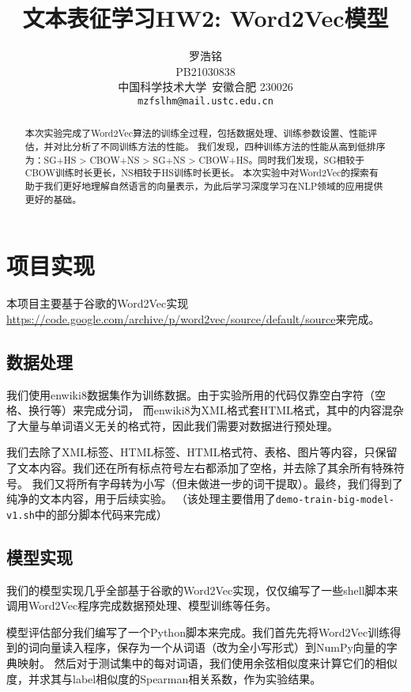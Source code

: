 \documentclass{article}
\title{文本表征学习HW2: Word2Vec模型}
\author{
  罗浩铭 \\
  PB21030838\\
  中国科学技术大学\ 安徽合肥 230026 \\
  \texttt{mzfslhm@mail.ustc.edu.cn} \\
}
\begin{document}
\maketitle


\begin{abstract}
  本次实验完成了Word2Vec算法的训练全过程，包括数据处理、训练参数设置、性能评估，并对比分析了不同训练方法的性能。
  我们发现，四种训练方法的性能从高到低排序为：SG+HS > CBOW+NS > SG+NS > CBOW+HS。同时我们发现，SG相较于CBOW训练时长更长，NS相较于HS训练时长更长。
  本次实验中对Word2Vec的探索有助于我们更好地理解自然语言的向量表示，为此后学习深度学习在NLP领域的应用提供更好的基础。
\end{abstract}

\section{项目实现}

本项目主要基于谷歌的Word2Vec实现\url{https://code.google.com/archive/p/word2vec/source/default/source}来完成。

\subsection{数据处理}

我们使用enwiki8数据集作为训练数据。由于实验所用的代码仅靠空白字符（空格、换行等）来完成分词，
而enwiki8为XML格式套HTML格式，其中的内容混杂了大量与单词语义无关的格式符，因此我们需要对数据进行预处理。

我们去除了XML标签、HTML标签、HTML格式符、表格、图片等内容，只保留了文本内容。我们还在所有标点符号左右都添加了空格，并去除了其余所有特殊符号。
我们又将所有字母转为小写（但未做进一步的词干提取）。最终，我们得到了纯净的文本内容，用于后续实验。
（该处理主要借用了\texttt{demo-train-big-model-v1.sh}中的部分脚本代码来完成）


\subsection{模型实现}
我们的模型实现几乎全部基于谷歌的Word2Vec实现，仅仅编写了一些shell脚本来调用Word2Vec程序完成数据预处理、模型训练等任务。

模型评估部分我们编写了一个Python脚本来完成。我们首先先将Word2Vec训练得到的词向量读入程序，保存为一个从词语（改为全小写形式）到NumPy向量的字典映射。
然后对于测试集中的每对词语，我们使用余弦相似度来计算它们的相似度，并求其与label相似度的Spearman相关系数，作为实验结果。
\end{document}

